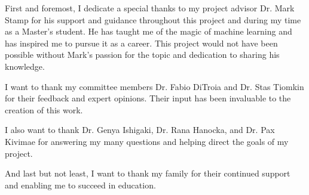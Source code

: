 First and foremost, I dedicate a special thanks to my project advisor Dr. Mark Stamp for his support and guidance throughout this project and during my time as a Master's student. He has taught me of the magic of machine learning and has inspired me to pursue it as a career. This project would not have been possible without Mark's passion for the topic and dedication to sharing his knowledge.

I want to thank my committee members Dr. Fabio DiTroia and Dr. Stas Tiomkin for their feedback and expert opinions. Their input has been invaluable to the creation of this work.

I also want to thank Dr. Genya Ishigaki, Dr. Rana Hanocka, and Dr. Pax Kivimae for answering my many questions and helping direct the goals of my project.

And last but not least, I want to thank my family for their continued support and enabling me to succeed in education.